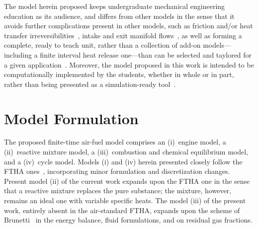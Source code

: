     The model herein proposed keeps undergraduate mechanical engineering education as its audience, and differs from other models in the sense that it avoids further complications  present  in
    other  models,  such  as  friction  and/or  heat  transfer  irreversibilities~\cite{2008-CurtoRissoPL+HernandezAC-JApplPhys,  2002-CatonJA-IntJMechEngEduc},  intake   and   exit   manifold
    flows~\cite{2001-CatonJA-IntJMechEngEduc}, as well as forming a complete, ready to teach unit, rather than a  collection  of  add-on  models---including  a  finite  interval  heat  release
    one---than can be selected and taylored for a given application~\cite{2013-MartinsJJG-Publindustria}. Moreover,  the  model  proposed  in  this  work  is  intended  to  be  computationally
    implemented by the students, whether in whole or in part, rather than being presented as a simulation-ready tool~\cite{2011-ZuecoJ-IntJMechEngEduc}.



\section{Model Formulation}\label{sec:model}

    The proposed finite-time air-fuel model comprises an (i)~engine model, a (ii)~reactive mixture model, a (iii)~combustion and chemical equilibrium model, and a (iv)~cycle model. Models  (i)
    and (iv) herein presented closely follow the FTHA ones~\cite{2017-NaaktgeborenC-IntJMechEngEduc}, incorporating minor formulation and discretization changes.  Present  model  (ii)  of  the
    current work expands upon the FTHA one in the sense that a reactive mixture replaces the pure substance; the mixture, however, remains an ideal one with variable specific heats. The  model
    (iii) of the present work, entirely absent in the air-standard FTHA, expands upon the scheme of Brunetti~\cite{2012-BrunettiF-Blucher} in the energy balance,  fluid  formulations,  and  on
    residual gas fractions.



